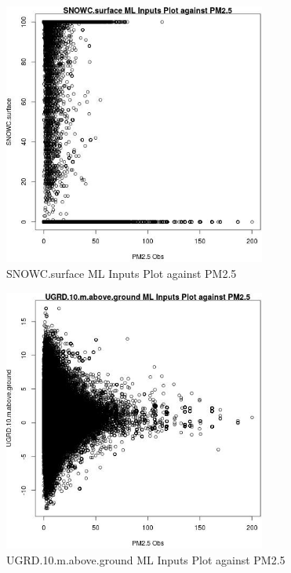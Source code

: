 \begin{figure} 
\centering  
\includegraphics[width=0.77\textwidth]{Code_Outputs/ML_input_report_ML_input_PM25_Step5_part_d_de_duplicated_aves_ML_input_SNOWCsurfacevPM25_Obs.jpg} 
\caption{\label{fig:ML_input_report_ML_input_PM25_Step5_part_d_de_duplicated_aves_ML_inputSNOWCsurfacevPM25_Obs}SNOWC.surface ML Inputs Plot against PM2.5} 
\end{figure} 
 

\begin{figure} 
\centering  
\includegraphics[width=0.77\textwidth]{Code_Outputs/ML_input_report_ML_input_PM25_Step5_part_d_de_duplicated_aves_ML_input_UGRD10mabovegroundvPM25_Obs.jpg} 
\caption{\label{fig:ML_input_report_ML_input_PM25_Step5_part_d_de_duplicated_aves_ML_inputUGRD10mabovegroundvPM25_Obs}UGRD.10.m.above.ground ML Inputs Plot against PM2.5} 
\end{figure} 
 


